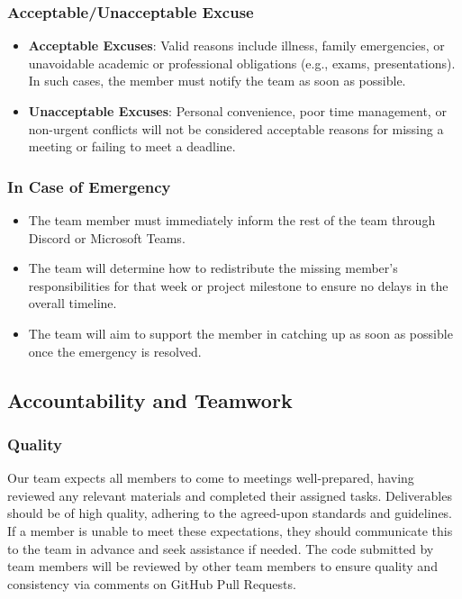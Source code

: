 \documentclass{article}
\begin{document}
\subsubsection*{Acceptable/Unacceptable Excuse}

\begin{itemize}
    \item \textbf{Acceptable Excuses}: 
    Valid reasons include illness, family emergencies, or unavoidable academic or professional obligations (e.g., exams, presentations). In such cases, the member must notify the team as soon as possible.
    \item \textbf{Unacceptable Excuses}: 
    Personal convenience, poor time management, or non-urgent conflicts will not be considered acceptable reasons for missing a meeting or failing to meet a deadline.
\end{itemize}

\subsubsection*{In Case of Emergency}

\begin{itemize}
    \item The team member must immediately inform the rest of the team through Discord or Microsoft Teams.
    \item The team will determine how to redistribute the missing member's responsibilities for that week or project milestone to ensure no delays in the overall timeline.
    \item The team will aim to support the member in catching up as soon as possible once the emergency is resolved.
\end{itemize}

\subsection*{Accountability and Teamwork}

\subsubsection*{Quality} 

Our team expects all members to come to meetings well-prepared, having reviewed any 
relevant materials and completed their assigned tasks. Deliverables should be of high 
quality, adhering to the agreed-upon standards and guidelines. If a member is unable 
to meet these expectations, they should communicate this to the team in advance and 
seek assistance if needed. The code submitted by team members will be reviewed by 
other team members to ensure quality and consistency via comments on GitHub Pull Requests.
\end{document}
